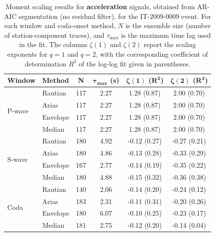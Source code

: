 \begin{table}[H]
\centering
\small
\begin{tabular}{llcccc}
\toprule
\textbf{Window} & \textbf{Method} & \textbf{N} & $\bm{\tau_{\max}}$ \textbf{(s)} & $\bm{\zeta(1)}$ \textbf{(}$\bm{R^2}$\textbf{)} & $\bm{\zeta(2)}$ \textbf{(}$\bm{R^2}$\textbf{)} \\
\midrule
\multirow{4}{*}{P-wave}
& Rautian & 117 & 2.27 & 1.28 (0.87) & 2.00 (0.70) \\
& Arias & 117 & 2.27 & 1.28 (0.87) & 2.00 (0.70) \\
& Envelope & 117 & 2.27 & 1.28 (0.87) & 2.00 (0.70) \\
& Median & 117 & 2.27 & 1.28 (0.87) & 2.00 (0.70) \\
\midrule
\multirow{4}{*}{S-wave}
& Rautian & 180 & 4.92 & -0.12 (0.27) & -0.27 (0.21) \\
& Arias & 180 & 4.86 & -0.13 (0.28) & -0.33 (0.29) \\
& Envelope & 167 & 2.77 & -0.14 (0.19) & -0.35 (0.22) \\
& Median & 180 & 4.88 & -0.15 (0.32) & -0.36 (0.38) \\
\midrule
\multirow{4}{*}{Coda}
& Rautian & 140 & 2.06 & -0.14 (0.20) & -0.24 (0.12) \\
& Arias & 183 & 2.31 & -0.11 (0.31) & -0.20 (0.26) \\
& Envelope & 180 & 6.07 & -0.10 (0.25) & -0.23 (0.17) \\
& Median & 181 & 2.75 & -0.12 (0.20) & -0.14 (0.04) \\
\bottomrule
\end{tabular}
\caption{Moment scaling results for \textbf{acceleration} signals, obtained from AR-AIC segmentation (no residual filter), for the IT-2009-0009 event. For each window and coda-onset method, $N$ is the ensemble size (number of station-component traces), and $\tau_{\max}$ is the maximum time lag used in the fit. The columns $\zeta(1)$ and $\zeta(2)$ report the scaling exponents for $q=1$ and $q=2$, with the corresponding coefficient of determination $R^2$ of the log-log fit given in parentheses.}
\label{tab:ar_aic_scaling_acc_nothresh_laquila}
\end{table}